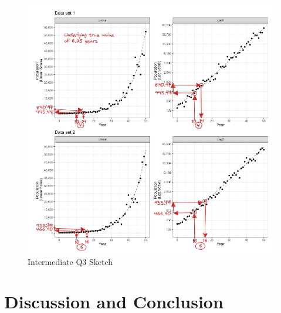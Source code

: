 \documentclass[print]{nuthesis}
\begin{document}
\begin{figure}[tbp]

{\centering \includegraphics[width=1\linewidth,]{images/03-estimation/qi3-sketch} 

}

\caption{Intermediate Q3 Sketch}\label{fig:qi3-sketch}
\end{figure}

\hypertarget{discussion-and-conclusion-2}{%
\section{Discussion and Conclusion}\label{discussion-and-conclusion-2}}
\end{document}
